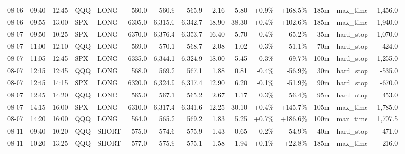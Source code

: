 \documentclass[11pt,a4paper,twoside]{article}
\begin{document}
\begin{landscape}
\begin{center}
\begin{longtable}{>{\color{txtmain}}l l l l l r r r r r r r r >{\color{txtmain}}l r}
08-06 & 09:40 & 12:45 & QQQ & LONG & 560.0 & 560.9 & 565.9 & 2.16 & 5.80 & \textcolor{wingreen}{+0.9\%} & \textcolor{wingreen}{+168.5\%} & 185m & max\_time & \textcolor{wingreen}{1,456.0} \\
08-06 & 09:55 & 13:00 & SPX & LONG & 6305.0 & 6,315.0 & 6,342.7 & 18.90 & 38.30 & \textcolor{wingreen}{+0.4\%} & \textcolor{wingreen}{+102.6\%} & 185m & max\_time & \textcolor{wingreen}{1,940.0} \\
08-07 & 09:50 & 10:25 & SPX & LONG & 6370.0 & 6,376.4 & 6,353.7 & 16.40 & 5.70 & \textcolor{lossred}{-0.4\%} & \textcolor{lossred}{-65.2\%} & 35m & hard\_stop & \textcolor{lossred}{-1,070.0} \\
08-07 & 11:00 & 12:10 & QQQ & LONG & 569.0 & 570.1 & 568.7 & 2.08 & 1.02 & \textcolor{lossred}{-0.3\%} & \textcolor{lossred}{-51.1\%} & 70m & hard\_stop & \textcolor{lossred}{-424.0} \\
08-07 & 11:05 & 12:45 & SPX & LONG & 6335.0 & 6,344.1 & 6,324.9 & 18.00 & 5.45 & \textcolor{lossred}{-0.3\%} & \textcolor{lossred}{-69.7\%} & 100m & hard\_stop & \textcolor{lossred}{-1,255.0} \\
08-07 & 12:15 & 12:45 & QQQ & LONG & 568.0 & 569.2 & 567.1 & 1.88 & 0.81 & \textcolor{lossred}{-0.4\%} & \textcolor{lossred}{-56.9\%} & 30m & hard\_stop & \textcolor{lossred}{-535.0} \\
08-07 & 12:45 & 14:15 & SPX & LONG & 6320.0 & 6,324.9 & 6,317.4 & 12.90 & 6.20 & \textcolor{lossred}{-0.1\%} & \textcolor{lossred}{-51.9\%} & 90m & hard\_stop & \textcolor{lossred}{-670.0} \\
08-07 & 12:45 & 14:20 & QQQ & LONG & 565.0 & 567.1 & 565.2 & 2.67 & 1.17 & \textcolor{lossred}{-0.3\%} & \textcolor{lossred}{-56.4\%} & 95m & hard\_stop & \textcolor{lossred}{-453.0} \\
08-07 & 14:15 & 16:00 & SPX & LONG & 6310.0 & 6,317.4 & 6,341.6 & 12.25 & 30.10 & \textcolor{wingreen}{+0.4\%} & \textcolor{wingreen}{+145.7\%} & 105m & max\_time & \textcolor{wingreen}{1,785.0} \\
08-07 & 14:20 & 16:00 & QQQ & LONG & 564.0 & 565.2 & 569.2 & 1.83 & 5.25 & \textcolor{wingreen}{+0.7\%} & \textcolor{wingreen}{+186.6\%} & 100m & max\_time & \textcolor{wingreen}{1,707.5} \\
08-11 & 09:40 & 10:20 & QQQ & SHORT & 575.0 & 574.6 & 575.9 & 1.43 & 0.65 & \textcolor{lossred}{-0.2\%} & \textcolor{lossred}{-54.9\%} & 40m & hard\_stop & \textcolor{lossred}{-471.0} \\
08-11 & 10:20 & 13:25 & QQQ & SHORT & 577.0 & 575.9 & 575.1 & 1.58 & 1.94 & \textcolor{wingreen}{+0.1\%} & \textcolor{wingreen}{+22.8\%} & 185m & max\_time & \textcolor{wingreen}{216.0} \\

\end{longtable}
\end{center}
\end{landscape}
\end{document}
